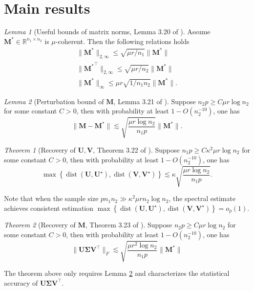 \documentclass[12pt]{article}
\theoremstyle{remark}
\newcommand{\bs}[1]{{\boldsymbol{#1}^*}}
\newcommand{\bb}[1]{{\boldsymbol {#1}}}
\newtheorem{theorem}{Theorem}
\newtheorem{lemma}{Lemma}
\begin{document}
\section{Main results}

\begin{lemma}[Useful bounds of matrix norms, Lemma 3.20 of \cite{Chen:2021}]
\label{LEM1}
Assume $\bs M \in \mathbb{R}^{n_1\times n_2}$ is $\mu$-coherent. Then the following relations holds
\begin{align}
    \|\bs M\|_{2,\infty} \leq \sqrt{\mu r/n_1}\|\bs M\|\\
     \|\bs M^\top\|_{2,\infty} \leq \sqrt{\mu r/n_2}\|\bs M\|\\
      \|\bs M\|_{\infty} \leq \mu r\sqrt{1/n_1n_2}\|\bs M\|.
\end{align}
\end{lemma}

\begin{lemma}[Perturbation bound of $\bb M$, Lemma 3.21 of \cite{Chen:2021}]
\label{LEM2}
Suppose $n_2 p\geq C\mu r\log n_2$ for some constant $C>0$, then with probability at least $1-O(n_2^{-10})$, one has 
\[
\|\bb M -\bs M\| 
\lesssim
\sqrt{\frac{\mu r\log n_2}{n_1 p}} \|\bs M\|.
\]
\end{lemma}

\begin{theorem}[Recovery of $\boldsymbol {U}, \boldsymbol {V}$, Theorem 3.22 of \cite{Chen:2021}]
\label{THM1}
Suppose $n_1 p\geq C \kappa^2 \mu r\log n_2$ for some constant $C>0$, then with probability at least $1-O(n_2^{-10})$, one has
$$
\max \left\{\operatorname{dist}\left(\boldsymbol{U}, \boldsymbol{U}^{\star}\right), \operatorname{dist}\left(\boldsymbol{V}, \boldsymbol{V}^{\star}\right)\right\}  
\lesssim
 \kappa \sqrt{\frac{\mu r \log n_2}{n_1 p}}.
$$
\end{theorem}
Note that when the sample size $pn_1 n_2 \gg \kappa^2 \mu r n_2 \log n_2$, the spectral estimate achieves consistent estimation $\max \left\{\operatorname{dist}\left(\boldsymbol{U}, \boldsymbol{U}^{\star}\right), \operatorname{dist}\left(\boldsymbol{V}, \boldsymbol{V}^{\star}\right)\right\} = o_p(1)$.


\begin{theorem}[Recovery of $\boldsymbol M$, Theorem 3.23 of \cite{Chen:2021}]
\label{THM2}
Suppose $n_2 p\geq C\mu r\log n_2$ for some constant $C>0$, then with probability at least $1-O(n_2^{-10})$, one has 
\[
\|\bb U\bb \Sigma \bb V^{\top}\|_F 
\lesssim
\sqrt{\frac{\mu r^2\log n_2}{n_1 p }} \|\bs M\|
\]
\end{theorem}
The theorem above only requires Lemma \ref{LEM2} and characterizes the statistical accuracy of $\bb U\bb \Sigma \bb V^\top$.
\end{document}
